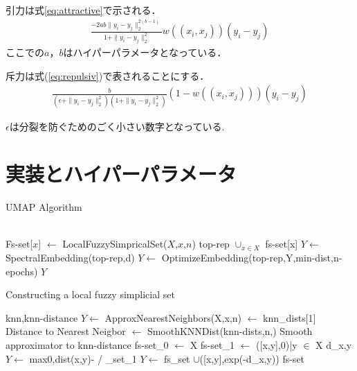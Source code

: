 \documentclass{jsarticle}
\begin{document}
引力は式\ref{eq:attractive}で示される．
\begin{eqnarray}
  \label{eq:attractive}
  \frac{-2ab \| y_i -y_j\| _2 ^{2(b-1)}}{1+\|y_i-y_j\| _2 ^2} w((x_i,x_j))(y_i-y_j)
\end{eqnarray}
ここでの$a$，$b$はハイパーパラメータとなっている．

斥力は式(\ref{eq:repulsiv})で表されることにする．
\begin{eqnarray}
  \frac{b}{(\epsilon + \| y_i - y_j\|_2^2)(1+ \| y_i - y_j\|_2^2)}(1-w((x_i,x_j)))(y_i-y_j)
\end{eqnarray}

$\epsilon$は分裂を防ぐためのごく小さい数字となっている.

\section{実装とハイパーパラメータ}
\begin{algorithm}
  \caption{UMAP Algorithm}
  \label{alg:1}
  \begin{algorithmic}
      \\
      \State Fs-set[$x$] $\leftarrow$ LocalFuzzySimpricalSet($X$,$x$,$n$)
      \EndFor
    \State top-rep \leftarrow $\cup _{x \in X}$ fs-set[x]
    \State $Y \leftarrow$ SpectralEmbedding(top-rep,d)
    \State $Y \leftarrow$ OptimizeEmbedding(top-rep,Y,min-dist,n-epochs)
    \State \Return $Y$
    \EndFunction
  \end{algorithmic}
\end{algorithm}

\begin{algorithm}
  \caption{Constructing a local fuzzy simplicial set}
  \label{alg:2}
  \begin{algorithmic}
    \State knn,knn-distance $Y \leftarrow$ ApproxNearestNeighbors(X,x,n)
    \State \rho $\leftarrow$ knn_dists[1] \rhd Distance to Nearest Neigbor
    \State \Sigma $\leftarrow$ SmoothKNNDist(knn-dists,n,\rho) \rhd Smooth approximator to knn-distance
    \State fs-set_0 $\leftarrow$ X
    \State fs-set_1 $\leftarrow$ {([x,y],0)|y  $\in$ X}
    \State d_{x,y}$Y \leftarrow$ max{0,dist(x,y)-\rho} / \sigma
    \Statefs_set_1 $Y \leftarrow$ fs_set $\cup$([x,y],exp(-d_{x,y}))
    \EndFor
    \State \Return fs-set
    \EndFunction
  \end{algorithmic}
\end{algorithm}
\end{document}
